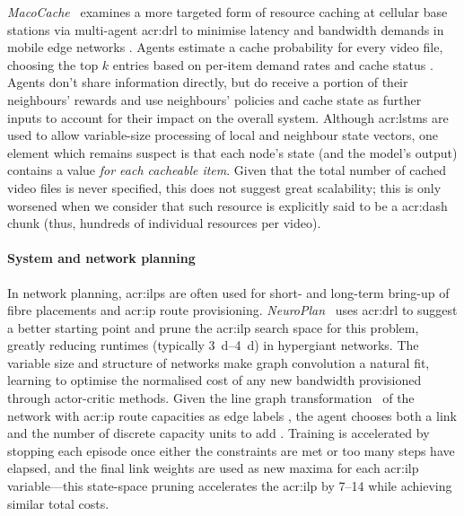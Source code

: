 \emph{MacoCache}~\parencite{DBLP:conf/infocom/Wang0LSS20} examines a more targeted form of resource caching at cellular base stations via multi-agent \gls{acr:drl} to minimise latency and bandwidth demands in mobile edge networks \prllitreward.
Agents estimate a cache probability for every video file, choosing the top $k$ entries \prllitactreal{} based on per-item demand rates and cache status \prllitstate.
Agents don't share information directly, but do receive a portion of their neighbours' rewards and use neighbours' policies and cache state as further inputs to account for their impact on the overall system.
Although \glspl{acr:lstm} are used to allow variable-size processing of local and neighbour state vectors, one element which remains suspect is that each node's state (and the model's output) contains a value \emph{for each cacheable item}.
Given that the total number of cached video files is never specified, this does not suggest great scalability; this is only worsened when we consider that such resource is explicitly said to be a \gls{acr:dash} chunk (thus, hundreds of individual resources per video).

\paragraph{System and network planning}
In network planning, \glspl{acr:ilp} are often used for short- and long-term bring-up of fibre placements and \gls{acr:ip} route provisioning.
\emph{NeuroPlan}~\parencite{DBLP:conf/sigcomm/ZhuGATZJ21} uses \gls{acr:drl} to suggest a better starting point and prune the \gls{acr:ilp} search space for this problem, greatly reducing runtimes (typically \qtyrange{3}{4}{\day}) in hypergiant networks.
The variable size and structure of networks make graph convolution a natural fit, learning to optimise the normalised cost of any new bandwidth provisioned \prllitreward{} through actor-critic methods.
Given the line graph transformation~\parencite{Harary1960} of the network with \gls{acr:ip} route capacities as edge labels \prllitstate, the agent chooses both a link and the number of discrete capacity units to add \prllitact.
Training is accelerated by stopping each episode once either the constraints are met or too many steps have elapsed, and the final link weights are used as new maxima for each \gls{acr:ilp} variable---this state-space pruning accelerates the \gls{acr:ilp} by \qtyrange{7}{14}{\times} while achieving similar total costs.

